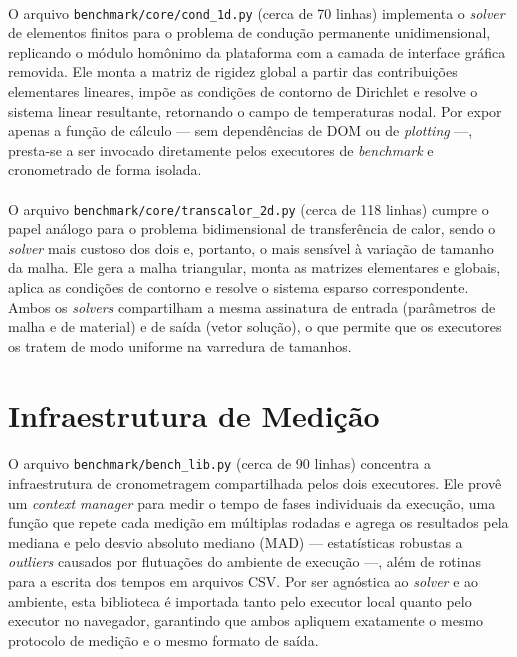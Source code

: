\paragraph{}O arquivo \texttt{benchmark/core/cond\_1d.py} (cerca de 70 linhas) implementa o \textit{solver} de elementos finitos para o problema de condução permanente unidimensional, replicando o módulo homônimo da plataforma com a camada de interface gráfica removida. Ele monta a matriz de rigidez global a partir das contribuições elementares lineares, impõe as condições de contorno de Dirichlet e resolve o sistema linear resultante, retornando o campo de temperaturas nodal. Por expor apenas a função de cálculo --- sem dependências de DOM ou de \textit{plotting} ---, presta-se a ser invocado diretamente pelos executores de \textit{benchmark} e cronometrado de forma isolada.

\paragraph{}O arquivo \texttt{benchmark/core/transcalor\_2d.py} (cerca de 118 linhas) cumpre o papel análogo para o problema bidimensional de transferência de calor, sendo o \textit{solver} mais custoso dos dois e, portanto, o mais sensível à variação de tamanho da malha. Ele gera a malha triangular, monta as matrizes elementares e globais, aplica as condições de contorno e resolve o sistema esparso correspondente. Ambos os \textit{solvers} compartilham a mesma assinatura de entrada (parâmetros de malha e de material) e de saída (vetor solução), o que permite que os executores os tratem de modo uniforme na varredura de tamanhos.

\section{Infraestrutura de Medição}
\label{ap:bench_lib}

\paragraph{}O arquivo \texttt{benchmark/bench\_lib.py} (cerca de 90 linhas) concentra a infraestrutura de cronometragem compartilhada pelos dois executores. Ele provê um \textit{context manager} para medir o tempo de fases individuais da execução, uma função que repete cada medição em múltiplas rodadas e agrega os resultados pela mediana e pelo desvio absoluto mediano (MAD) --- estatísticas robustas a \textit{outliers} causados por flutuações do ambiente de execução ---, além de rotinas para a escrita dos tempos em arquivos CSV. Por ser agnóstica ao \textit{solver} e ao ambiente, esta biblioteca é importada tanto pelo executor local quanto pelo executor no navegador, garantindo que ambos apliquem exatamente o mesmo protocolo de medição e o mesmo formato de saída.

